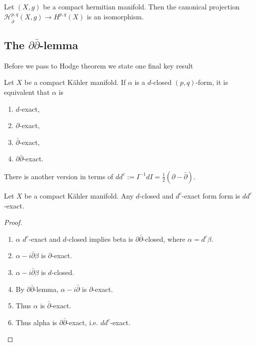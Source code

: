 \begin{corollary}
\label{lemma-harmo-pq-dolbe-pq}
Let $(X,g)$ be a compact hermitian manifold.
Then the canonical projection
$\mathcal{H}_{\bar\partial}^{p,q}(X,g)\to
H^{p,q}(X)$
is an isomorphism.
\end{corollary}

\subsection{The $\partial\bar\partial$-lemma}
\label{subsection-ddbar-lemma}

\medskip\noindent
Before we pass to Hodge theorem we state one
final key result

\begin{lemma}
\label{lemma-ddbar}
Let $X$ be a compact Kähler manifold.
If $\alpha$ is a $d$-closed $(p,q)$-form,
it is equivalent that $\alpha$ is
\begin{enumerate}
\item $d$-exact,
\item $\partial$-exact,
\item $\bar\partial$-exact,
\item $\partial \bar\partial$-exact.
\end{enumerate}
\end{lemma}

\noindent
There is another version in terms of
$dd^c:=
I^{-1}dI=\frac{1}{2}(\partial-\bar\partial)$.

\begin{lemma}
\label{lemma-ddc}
\begin{reference}
\cite[Lemma 3.A.22]{huc}
\end{reference}
Let $X$ be a compact Kähler manifold.
Any $d$-closed and $d^c$-exact form form is
$dd^c$-exact.
\end{lemma}

\begin{proof}
\begin{enumerate}
\item $\alpha$ $d^c$-exact and $d$-closed 
implies beta is $\partial \bar\partial$-closed, 
where $\alpha=d^c\beta$.
\item $\alpha- i \bar\partial \beta$
is $\partial$-exact.
\item $\alpha-i \bar\partial\beta$
is $d$-closed.
\item By $\partial\bar\partial$-lemma,
$\alpha - i \bar\partial$ is
$\partial$-exact.
\item Thus $\alpha$ is $\bar\partial$-exact.
\item Thus alpha is 
$\partial\bar\partial$-exact,
i.e. $dd^c$-exact.
\end{enumerate}
\end{proof}

